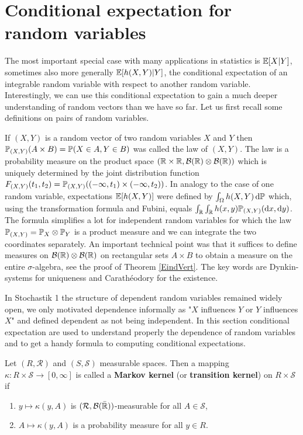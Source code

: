 \section{Conditional expectation for random variables}
The most important special case with many applications in statistics is $\E[X|Y]$, sometimes also more generally $\E[h(X,Y)|Y]$, the conditional expectation of an integrable random variable with respect to another random variable. Interestingly, we can use this conditional expectation to gain a much deeper understanding of random vectors than we have so far. Let us first recall some definitions on pairs of random variables.
\begin{lreminder}
If $(X,Y)$ is a random vector of two random variables $X$ and $Y$ then $\P_{(X,Y)}(A\times B)=\P(X\in A, Y\in B)$ was called the law of $(X,Y)$. The law is a probability measure on the product space $(\R\times \R, \mathcal B(\R)\otimes \mathcal B(\R))$ which is uniquely determined by the joint distribution function $F_{(X,Y)}(t_1,t_2)=\P_{(X,Y)}((-\infty,t_1)\times (-\infty,t_2))$. In analogy to the case of one random variable, expectations $\E[h(X,Y)]$ were defined by $\int_\Omega h(X,Y)\dint \P$ which, using the transformation formula and Fubini, equals $\int_\R \int_\R h(x,y)  \P_{(X,Y)}(\textrm d x,\textrm d y)$. The formula simplifies a lot for independent random variables for which the law $\P_{(X,Y)}=\P_X\otimes \P_Y$ is a product measure and we can integrate the two coordinates separately. An important technical point was that it suffices to define measures on $\mathcal B(\R)\otimes \mathcal B(\R)$ on rectangular sets $A\times B$ to obtain a measure on the entire $\sigma$-algebra, see the proof of Theorem \ref{EindVert}. The key words are Dynkin-systems for uniqueness and Carath\'eodory for the existence.
\end{lreminder}
 In Stochastik 1 the structure of dependent random variables remained widely open, we only motivated dependence informally as "{}$X$ influences $Y$ or $Y$ influences $X$"{} and defined dependent as not being independent. In this section conditional expectation are used to understand properly the  dependence of random variables and to get a handy formula to computing conditional expectations.
\begin{ldef}
\begin{deff}
	Let $(R,\mathcal R)$ and $(S, \mathcal S)$ measurable spaces. Then a mapping $\kappa: R\times \mathcal S\to [0,\infty]$ is called a \textbf{Markov kernel} (or \textbf{transition kernel}) on $R\times \mathcal S$ if 
	\begin{enumerate}[label=(\roman*)]
		\item $y\mapsto \kappa(y,A)$ is $(\mathcal R, \mathcal B(\bar \R))$-measurable for all $A\in \mathcal S$,
		\item $A\mapsto \kappa(y,A)$ is a probability measure for all $y\in R$.
	\end{enumerate}	
\end{deff}
\end{ldef}

